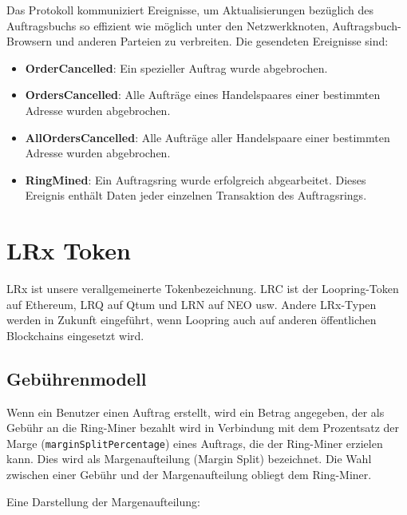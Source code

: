 \documentclass[UTF8,nofonts]{article}
\makeatletter
\newenvironment{figurehere}
 {\def\@captype{figure}}
 {}
\makeatother
\begin{document}
\begin{multicols}{2}
Das Protokoll kommuniziert Ereignisse, um Aktualisierungen bezüglich des Auftragsbuchs so effizient wie möglich unter den Netzwerkknoten, Auftragsbuch-Browsern und anderen Parteien zu verbreiten. Die gesendeten Ereignisse sind:

\begin{itemize}
	\item \textbf{OrderCancelled}: Ein spezieller Auftrag wurde abgebrochen.
	\item \textbf{OrdersCancelled}: Alle Aufträge eines Handelspaares einer bestimmten Adresse wurden abgebrochen.
	\item \textbf{AllOrdersCancelled}: Alle Aufträge aller Handelspaare einer bestimmten Adresse wurden abgebrochen.
	\item \textbf{RingMined}: Ein Auftragsring wurde erfolgreich abgearbeitet. Dieses Ereignis enthält Daten jeder einzelnen Transaktion des Auftragsrings.
\end{itemize}


\section{LRx Token\label{sec:token}}
LRx ist unsere verallgemeinerte Tokenbezeichnung. LRC ist der Loopring-Token auf Ethereum, LRQ auf Qtum und LRN auf NEO usw. Andere LRx-Typen werden in Zukunft eingeführt, wenn Loopring auch auf anderen öffentlichen Blockchains eingesetzt wird.

\subsection{Gebührenmodell\label{sec:fee_model}} 
Wenn ein Benutzer einen Auftrag erstellt, wird ein Betrag angegeben, der als Gebühr an die Ring-Miner bezahlt wird in Verbindung mit dem Prozentsatz der Marge (\verb|marginSplitPercentage|) eines Auftrags, die der Ring-Miner erzielen kann. Dies wird als Margenaufteilung (Margin Split) bezeichnet. Die Wahl zwischen einer Gebühr und der Margenaufteilung obliegt dem Ring-Miner.

Eine Darstellung der Margenaufteilung: 

\begin{center}
\begin{figurehere}
\centering
{}
\end{figurehere}
\end{center}
\end{multicols}
\end{document}
